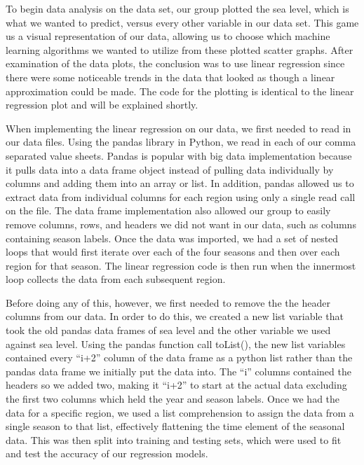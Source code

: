 \documentclass[12pt]{report}
\begin{document}
\par To begin data analysis on the data set, our group plotted the sea level, which is what we wanted to predict, versus every other variable in our data set. This game us a visual representation of our data, allowing us to choose which machine learning algorithms we wanted to utilize from these plotted scatter graphs. After examination of the data plots, the conclusion was to use linear regression since there were some noticeable trends in the data that looked as though a linear approximation could be made. The code for the plotting is identical to the linear regression plot and will be explained shortly.
\par When implementing the linear regression on our data, we first needed to read in our data files. Using the pandas library in Python, we read in each of our comma separated value sheets. Pandas is popular with big data implementation because it pulls data into a data frame object instead of pulling data individually by columns and adding them into an array or list. In addition, pandas allowed us to extract data from individual columns for each region using only a single read call on the file. The data frame implementation also allowed our group to easily remove columns, rows, and headers we did not want in our data, such as columns containing season labels. Once the data was imported, we had a set of nested loops that would first iterate over each of the four seasons and then over each region for that season. The linear regression code is then run when the innermost loop collects the data from each subsequent region.
\par Before doing any of this, however, we first needed to remove the the header columns from our data. In order to do this, we created a new list variable that took the old pandas data frames of sea level and the other variable we used against sea level. Using the pandas function call toList(), the new list variables contained every “i+2” column of the data frame as a python list rather than the pandas data frame we initially put the data into. The “i” columns contained the headers so we added two, making it “i+2” to start at the actual data excluding the first two columns which held the year and season labels. Once we had the data for a specific region, we used a list comprehension to assign the data from a single season to that list, effectively flattening the time element of the seasonal data. This was then split into training and testing sets, which were used to fit and test the accuracy of our regression models.
\end{document}
